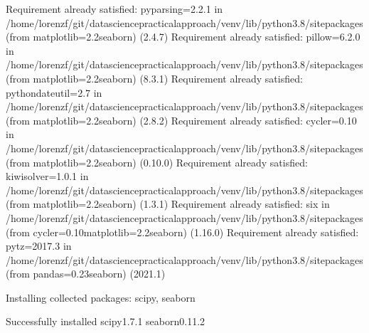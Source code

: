 \documentclass[letterpaper,10pt,english]{jupyterBook}
\begin{document}
\begin{sphinxVerbatim}[commandchars=\\\{\}]
Requirement already satisfied: pyparsing\PYGZgt{}=2.2.1 in /home/lorenzf/git/data\PYGZhy{}science\PYGZhy{}practical\PYGZhy{}approach/venv/lib/python3.8/site\PYGZhy{}packages (from matplotlib\PYGZgt{}=2.2\PYGZhy{}\PYGZgt{}seaborn) (2.4.7)
Requirement already satisfied: pillow\PYGZgt{}=6.2.0 in /home/lorenzf/git/data\PYGZhy{}science\PYGZhy{}practical\PYGZhy{}approach/venv/lib/python3.8/site\PYGZhy{}packages (from matplotlib\PYGZgt{}=2.2\PYGZhy{}\PYGZgt{}seaborn) (8.3.1)
Requirement already satisfied: python\PYGZhy{}dateutil\PYGZgt{}=2.7 in /home/lorenzf/git/data\PYGZhy{}science\PYGZhy{}practical\PYGZhy{}approach/venv/lib/python3.8/site\PYGZhy{}packages (from matplotlib\PYGZgt{}=2.2\PYGZhy{}\PYGZgt{}seaborn) (2.8.2)
Requirement already satisfied: cycler\PYGZgt{}=0.10 in /home/lorenzf/git/data\PYGZhy{}science\PYGZhy{}practical\PYGZhy{}approach/venv/lib/python3.8/site\PYGZhy{}packages (from matplotlib\PYGZgt{}=2.2\PYGZhy{}\PYGZgt{}seaborn) (0.10.0)
Requirement already satisfied: kiwisolver\PYGZgt{}=1.0.1 in /home/lorenzf/git/data\PYGZhy{}science\PYGZhy{}practical\PYGZhy{}approach/venv/lib/python3.8/site\PYGZhy{}packages (from matplotlib\PYGZgt{}=2.2\PYGZhy{}\PYGZgt{}seaborn) (1.3.1)
Requirement already satisfied: six in /home/lorenzf/git/data\PYGZhy{}science\PYGZhy{}practical\PYGZhy{}approach/venv/lib/python3.8/site\PYGZhy{}packages (from cycler\PYGZgt{}=0.10\PYGZhy{}\PYGZgt{}matplotlib\PYGZgt{}=2.2\PYGZhy{}\PYGZgt{}seaborn) (1.16.0)
Requirement already satisfied: pytz\PYGZgt{}=2017.3 in /home/lorenzf/git/data\PYGZhy{}science\PYGZhy{}practical\PYGZhy{}approach/venv/lib/python3.8/site\PYGZhy{}packages (from pandas\PYGZgt{}=0.23\PYGZhy{}\PYGZgt{}seaborn) (2021.1)
\end{sphinxVerbatim}

\begin{sphinxVerbatim}[commandchars=\\\{\}]
Installing collected packages: scipy, seaborn
\end{sphinxVerbatim}

\begin{sphinxVerbatim}[commandchars=\\\{\}]
Successfully installed scipy\PYGZhy{}1.7.1 seaborn\PYGZhy{}0.11.2
\end{sphinxVerbatim}
\end{document}
